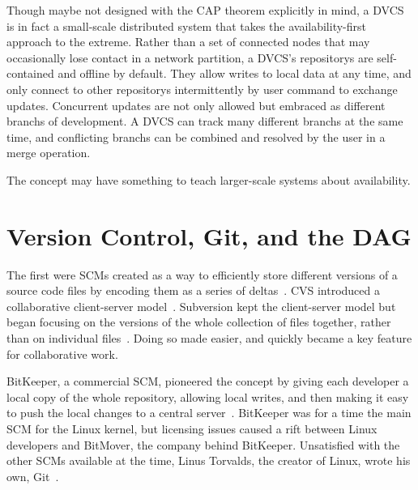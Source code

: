 Though maybe not designed with the CAP theorem explicitly in mind, a \gls{DVCS}
is in fact a small-scale distributed system that takes the availability-first
approach to the extreme. Rather than a set of connected nodes that may
occasionally lose contact in a network partition, a \gls{DVCS}'s
\glspl{repository} are self-contained and offline by default. They allow writes
to local data at any time, and only connect to other \glspl{repository}
intermittently by user command to exchange updates. Concurrent updates are not
only allowed but embraced as different \glspl{branch} of development. A
\gls{DVCS} can track many different \glspl{branch} at the same time, and
conflicting \glspl{branch} can be combined and resolved by the user in a
\gls{merge} operation.

The  concept may have something to
teach larger-scale systems about availability.

%



\section{Version Control, Git, and the DAG}

The first  were \glspl{SCM} created as a way to efficiently store
different versions of a source code files by encoding them as a series of
deltas~\cite{history_of_version_control}. CVS introduced a collaborative
client-server model~\cite{history_of_version_control,cvs_book}. Subversion kept
the client-server model but began focusing on the versions of the whole
collection of files together, rather than on individual
files~\cite{history_of_version_control,svnbook}. Doing so made
 easier, and  quickly
became a key feature for collaborative work.

BitKeeper, a commercial \gls{SCM}, pioneered the  concept by giving each developer a local copy of the whole
\gls{repository}, allowing local writes, and then making it easy to push the
local changes to a central
server~\cite{history_of_version_control,git_10_years_interview}. BitKeeper was
for a time the main \acrlong{SCM} for the Linux kernel, but licensing issues
caused a rift between Linux developers and BitMover, the company behind
BitKeeper. Unsatisfied with the other \glspl{SCM} available at the time, Linus
Torvalds, the creator of Linux, wrote his own,
Git~\cite{history_of_version_control,git_10_years_interview}.

